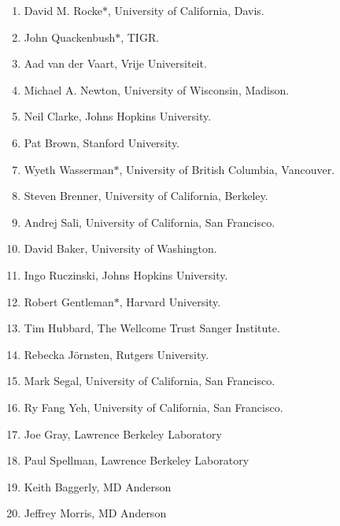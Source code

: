 \documentclass[12pt]{amsart}
\begin{document}
\begin{enumerate}
\item David M. Rocke$\mathbf{*}$, University of California, Davis.

\item John Quackenbush$\mathbf{*}$, TIGR.

\item Aad van der Vaart, Vrije Universiteit.

\item Michael A. Newton, University of Wisconsin, Madison.

\item Neil Clarke, Johns Hopkins University.

\item Pat Brown, Stanford University.

\item Wyeth Wasserman$\mathbf{*}$, University of  British Columbia, 
Vancouver.

\item Steven Brenner, University of California, Berkeley.

\item Andrej Sali, University of California, San Francisco.

\item David Baker, University of Washington.

\item Ingo Ruczinski, Johns Hopkins University.

\item Robert Gentleman$\mathbf{*}$, Harvard University.

\item Tim Hubbard, The Wellcome 
Trust  Sanger Institute.

\item Rebecka J\"ornsten, Rutgers University.

\item Mark Segal, University of California, San Francisco.

\item Ry Fang Yeh, University of California, San Francisco.

\item Joe Gray, Lawrence Berkeley Laboratory

\item Paul Spellman, Lawrence Berkeley Laboratory

\item Keith Baggerly, MD Anderson

\item Jeffrey Morris, MD Anderson


\end{enumerate}
\end{document}
